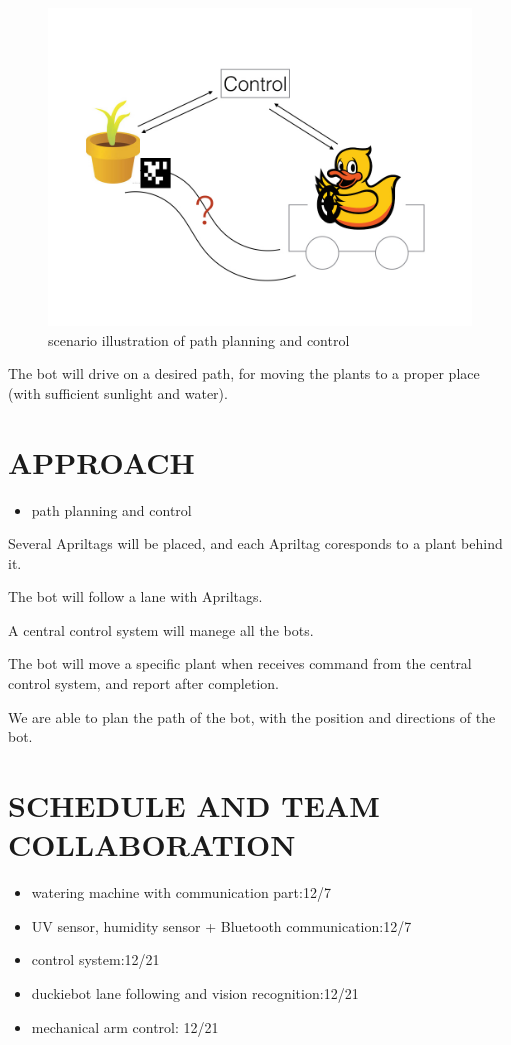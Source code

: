 \documentclass[a4paper, 10pt, conference]{ieeeconf}      %
\begin{document}
\begin{figure}[htbp] %
\includegraphics[width=0.8\columnwidth]{csp-aim-scenario.jpg}
\centering
\caption{scenario illustration of path planning and control}
\end{figure}


The bot will drive on a desired path, for moving the plants to a proper place (with sufficient sunlight and water).\\

\section{APPROACH}

\begin{itemize}
\item path planning and control
\end{itemize}


Several Apriltags will be placed, and each Apriltag coresponds to a plant behind it.

The bot will follow a lane with Apriltags.

A central control system will manege all the bots.

The bot will move a specific plant when receives command from the central control system, and report after completion.

We are able to plan the path of the bot, with the position and directions of the bot.

\section{SCHEDULE AND TEAM COLLABORATION}

\begin{itemize}
\item watering machine with communication part:12/7
\item UV sensor, humidity sensor + Bluetooth communication:12/7
\item control system:12/21
\item duckiebot lane following and vision recognition:12/21
\item mechanical arm control: 12/21
\end{itemize}
   
\end{document}
